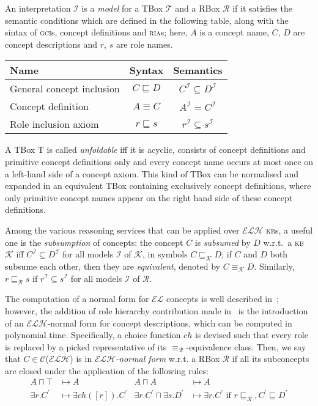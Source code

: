 \documentclass[]{llncs}
\theoremstyle{remark}
\newcommand{\el}{\(\mathcal{EL}{}\)}
\newcommand{\elh}{\(\mathcal{ELH}{}\)}
\newcommand{\kb}{\textsc{kb}}
\newcommand{\ria}{\textsc{ria}}
\newcommand{\gci}{\textsc{gci}}
\newcommand{\subsume}[1]{\sqsubseteq_{\mathcal{#1}}}
\begin{document}
  An interpretation \(\mathcal{I}\) is a \emph{model} for a TBox \(\mathcal{T}\) and a RBox \(\mathcal{R}\) if it satisfies the semantic conditions which are defined in the following table, along with the sintax of \gci{}s, concept definitions and \ria{}s; here, \(A\) is a concept name, \(C\), \(D\) are concept descriptions and \(r\), \(s\) are role names.
  \begin{center}
    \begin{tabular}{lcc}
      \toprule
      Name & Syntax & Semantics \\
      \midrule
      General concept inclusion & \(C \sqsubseteq D\) & \(C^\mathcal{I} \subseteq D^\mathcal{I}\) \\
      Concept definition & \(A \equiv C\) & \(A^\mathcal{I} = C^\mathcal{I}\) \\
      Role inclusion axiom & \(r \sqsubseteq s\) & \(r^\mathcal{I} \subseteq s^\mathcal{I}\) \\
      \bottomrule
    \end{tabular}
  \end{center}
  A TBox T is called \emph{unfoldable} iff it is acyclic, consists of concept definitions and primitive concept definitions only and every concept name occurs at most once on a left-hand side of a concept axiom.
  This kind of TBox can be normalised and expanded in an equivalent TBox containing exclusively concept definitions, where only primitive concept names appear on the right hand side of these concept definitions.

  Among the various reasoning services that can be applied over \elh{} \kb{}s, a useful one is the \emph{subsumption} of concepts: the concept \(C\) is \emph{subsumed} by \(D\) w.r.t.\ a \kb{} \(\mathcal{K}\) iff \(C^\mathcal{I} \subseteq D^\mathcal{I}\) for all models \(\mathcal{I}\) of \(\mathcal{K}\), in symbols \(C \subsume{K} D\);
  if \(C\) and \(D\) both subsume each other, then they are \emph{equivalent}, denoted by \(C \equiv_{\mathcal{K}} D\).
  Similarly, \(r \subsume{R} s\) if \(r^\mathcal{I} \subseteq s^\mathcal{I}\) for all models \(\mathcal{I}\) of \(\mathcal{R}\).

  The computation of a normal form for \el{} concepts is well described in~\cite{DLbook}; however, the addition of role hierarchy contribution made in~\cite{LeTu12} is the introduction of an \elh-normal form for concept descriptions, which can be computed in polynomial time.
  Specifically, a choice function \(ch{}\) is devised such that every role is replaced by a picked representative of its \(\equiv_\mathcal{R}\)-equivalence class.
  Then, we say that \(C \in \mathcal{C}\)(\elh) is in \emph{\elh-normal form} w.r.t. a RBox \(\mathcal{R}\) if all its subconcepts are closed under the application of the following rules:
  \begin{align*}
    A \sqcap \top &\mapsto A & A \sqcap A &\mapsto A \tag{1--2}\\
    \exists{}r.C^\prime &\mapsto \exists{}ch([r]).C^\prime &
    \exists{}r.C^\prime \sqcap \exists{}s.D^\prime &\mapsto
    \exists{}r.C^\prime\,\,\text{if}\,\,r\subsume{R}, C^\prime \sqsubseteq D^\prime \tag{3--4}
  \end{align*}
\end{document}
